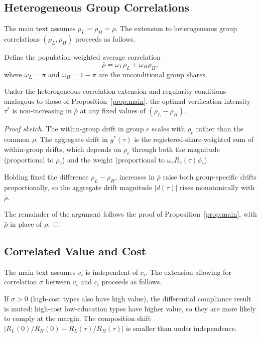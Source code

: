 \subsection{Heterogeneous Group Correlations}
\label{ssec:hetero_rho}

The main text assumes $\rho_L = \rho_H = \rho$. The extension to heterogeneous group correlations $(\rho_L, \rho_H)$ proceeds as follows.

Define the population-weighted average correlation
\[
\bar\rho = \omega_L \rho_L + \omega_H \rho_H,
\]
where $\omega_L = \pi$ and $\omega_H = 1 - \pi$ are the unconditional group shares.

\begin{proposition}
\label{prop:hetero_rho}
Under the heterogeneous-correlation extension and regularity conditions analogous to those of Proposition~\ref{prop:main}, the optimal verification intensity $\tau^*$ is non-increasing in $\bar\rho$ at any fixed values of $(\rho_L - \rho_H)$.
\end{proposition}

\begin{proof}[Proof sketch]
The within-group drift in group $e$ scales with $\rho_e$ rather than the common $\rho$. The aggregate drift in $g^*(\tau)$ is the registered-share-weighted sum of within-group drifts, which depends on $\rho_e$ through both the magnitude (proportional to $\rho_e$) and the weight (proportional to $\omega_e R_e(\tau) \phi_e$).

Holding fixed the difference $\rho_L - \rho_H$, increases in $\bar\rho$ raise both group-specific drifts proportionally, so the aggregate drift magnitude $|d(\tau)|$ rises monotonically with $\bar\rho$.

The remainder of the argument follows the proof of Proposition~\ref{prop:main}, with $\bar\rho$ in place of $\rho$.
\end{proof}

\subsection{Correlated Value and Cost}
\label{ssec:vcost}

The main text assumes $v_i$ is independent of $c_i$. The extension allowing for correlation $\sigma$ between $v_i$ and $c_i$ proceeds as follows.

If $\sigma > 0$ (high-cost types also have high value), the differential compliance result is muted: high-cost low-education types have higher value, so they are more likely to comply at the margin. The composition shift $|R_L(0)/R_H(0) - R_L(\tau)/R_H(\tau)|$ is smaller than under independence.

